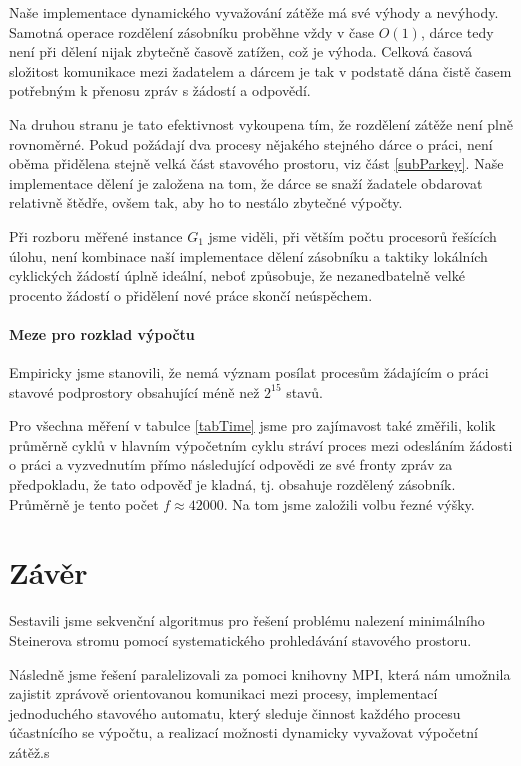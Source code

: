 \documentclass[12pt]{article}
\theoremstyle{definition}
\begin{document}
Naše implementace dynamického vyvažování zátěže má své výhody a nevýhody. Samotná operace rozdělení
zásobníku proběhne vždy v čase $O(1)$, dárce tedy není při dělení nijak zbytečně časově zatížen, což je výhoda.
Celková časová složitost komunikace mezi žadatelem a dárcem je tak v podstatě dána čistě časem potřebným k přenosu
zpráv s žádostí a odpovědí.

Na druhou stranu je tato efektivnost vykoupena tím, že rozdělení zátěže není plně rovnoměrné. Pokud požádají
dva procesy nějakého stejného dárce o práci, není oběma přidělena stejně velká část stavového prostoru, viz část \ref{subParkey}.
Naše implementace dělení je založena na tom, že dárce se snaží žadatele obdarovat relativně štědře, ovšem tak, aby ho to nestálo
zbytečné výpočty.

Při rozboru měřené instance $G_1$ jsme viděli, při větším počtu procesorů řešících úlohu, není kombinace naší
implementace dělení zásobníku a taktiky lokálních cyklických žádostí úplně ideální, neboť způsobuje, že nezanedbatelně
velké procento žádostí o přidělení nové práce skončí neúspěchem.

\paragraph{Meze pro rozklad výpočtu}
Empiricky jsme stanovili, že nemá význam posílat procesům žádajícím o práci stavové podprostory
obsahující méně než $2^{15}$ stavů.

Pro všechna měření v tabulce \ref{tabTime} jsme pro zajímavost také změřili, kolik průměrně cyklů v hlavním
výpočetním cyklu stráví proces mezi odesláním žádosti o práci a vyzvednutím přímo následující odpovědi ze své fronty zpráv za předpokladu,
že tato odpověď je kladná, tj. obsahuje rozdělený zásobník. Průměrně je tento počet $f\approx 42000$. Na tom jsme založili volbu řezné výšky. 

\section{Závěr}
Sestavili jsme sekvenční algoritmus pro řešení problému nalezení minimálního Steinerova stromu
pomocí systematického prohledávání stavového prostoru.

Následně jsme řešení paralelizovali za pomoci knihovny MPI, která nám umožnila
zajistit zprávově orientovanou komunikaci mezi procesy, implementací jednoduchého
stavového automatu, který sleduje činnost každého procesu účastnícího se výpočtu, a 
realizací možnosti dynamicky vyvažovat výpočetní zátěž.s
\end{document}
